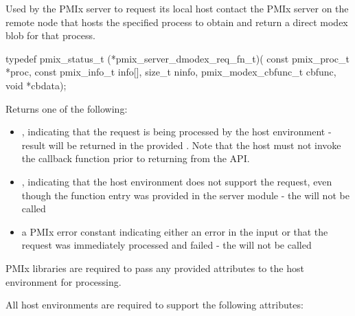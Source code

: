 \summary

Used by the PMIx server to request its local host contact the \ac{PMIx} server on the remote node that hosts the specified process to obtain and return a direct modex blob for that process.

\format

\cspecificstart
\begin{codepar}
typedef pmix_status_t (*pmix_server_dmodex_req_fn_t)(
                             const pmix_proc_t *proc,
                             const pmix_info_t info[],
                             size_t ninfo,
                             pmix_modex_cbfunc_t cbfunc,
                             void *cbdata);
\end{codepar}
\cspecificend

\begin{arglist}
\end{arglist}

Returns one of the following:

\begin{itemize}
    \item {}, indicating that the request is being processed by the host environment - result will be returned in the provided . Note that the host must not invoke the callback function prior to returning from the \ac{API}.
    \item {}, indicating that the host environment does not support the request, even though the function entry was provided in the server module - the  will not be called
    \item a PMIx error constant indicating either an error in the input or that the request was immediately processed and failed - the  will not be called
\end{itemize}

\reqattrstart
\ac{PMIx} libraries are required to pass any provided attributes to the host environment for processing.

All host environments are required to support the following attributes:

